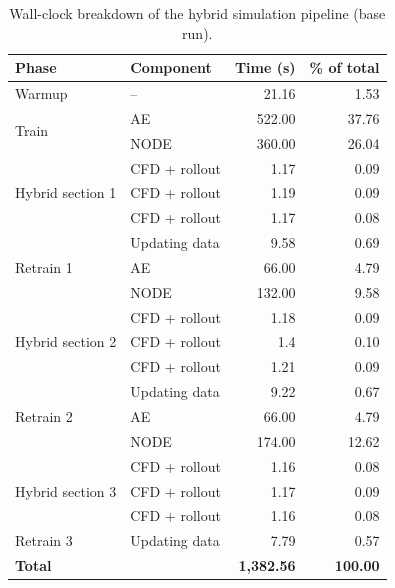 \begin{table}[htp]
    \centering
    \begin{tabular}{llrr}
        \toprule
        Phase & Component & Time (s) & \% of total \\
        \midrule
        Warmup & -- & 21.16 & 1.53 \\
        \midrule
        \multirow{2}{*}{Train} & AE   & 522.00 & 37.76 \\
                               & NODE & 360.00 & 26.04 \\
        \midrule
        \multirow{3}{*}{Hybrid section 1} & CFD + rollout & 1.17 & 0.09 \\
                                          & CFD + rollout & 1.19 & 0.09 \\
                                          & CFD + rollout & 1.17 & 0.08 \\
        \midrule
        \multirow{3}{*}{Retrain 1} & Updating data    & 9.58   & 0.69 \\
                                   & AE               & 66.00  & 4.79 \\
                                   & NODE             & 132.00 & 9.58 \\
        \midrule
        \multirow{3}{*}{Hybrid section 2} & CFD + rollout & 1.18 & 0.09 \\
                                          & CFD + rollout & 1.4 & 0.10 \\
                                          & CFD + rollout & 1.21 & 0.09 \\
        \midrule
        \multirow{3}{*}{Retrain 2} & Updating data    & 9.22   & 0.67 \\
                                   & AE               & 66.00  & 4.79 \\
                                   & NODE             & 174.00 & 12.62 \\
        \midrule
        \multirow{3}{*}{Hybrid section 3} & CFD + rollout & 1.16 & 0.08 \\
                                          & CFD + rollout & 1.17 & 0.09 \\
                                          & CFD + rollout & 1.16 & 0.08 \\
        \midrule
        Retrain 3 & Updating data & 7.79 & 0.57 \\
        \midrule
        \textbf{Total} & & \textbf{1,382.56} & \textbf{100.00} \\
        \bottomrule
    \end{tabular}
    \caption{Wall-clock breakdown of the hybrid simulation pipeline (base run).}
    \label{tab: wall_timing_hybrid}
\end{table}

